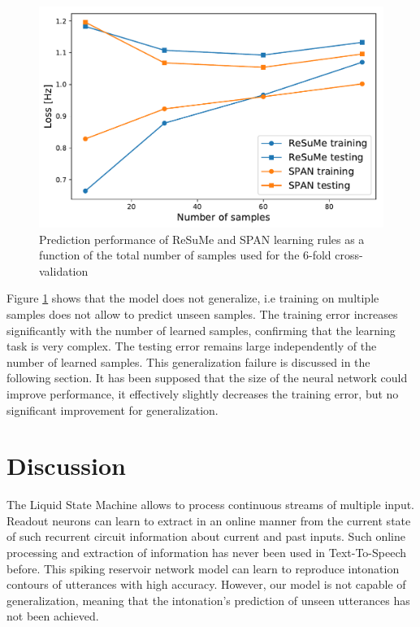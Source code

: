 \documentclass[11pt, a4paper]{article} %
\begin{document}
\begin{figure}
\centering
\includegraphics[scale=.7]{figures/CV.pdf}
\caption{Prediction performance of ReSuMe and SPAN learning rules as a function of the total number of samples used for the 6-fold cross-validation}
\label{multipleSample}
\end{figure}

Figure \ref{multipleSample} shows that the model does not generalize, i.e training on multiple samples does not allow to predict unseen samples. The training error increases significantly with the number of learned samples, confirming that the learning task is very complex. The testing error remains large independently of the number of learned samples. This generalization failure is discussed in the following section. It has been supposed that the size of the neural network could improve performance, it effectively slightly decreases the training error, but no significant improvement for generalization.


\section{Discussion}



The Liquid State Machine allows to process continuous streams of multiple input. Readout neurons can learn to extract in an online manner from the current state of such recurrent circuit information about current and past inputs. Such online processing and extraction of information has never been used in Text-To-Speech before. This spiking reservoir network model can learn to reproduce intonation contours of utterances with high accuracy. However, our model is not capable of generalization, meaning that the intonation's prediction of unseen utterances has not been achieved.
\end{document}
